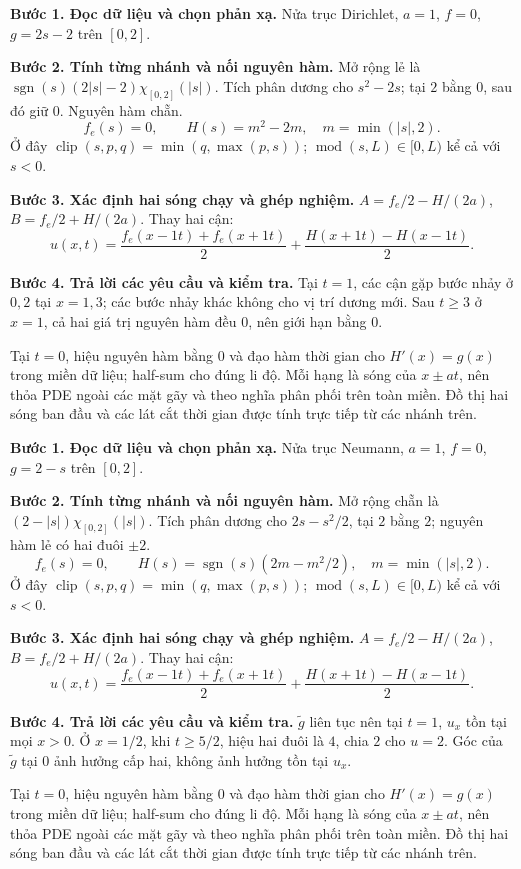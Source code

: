 \textbf{Bước 1. Đọc dữ liệu và chọn phản xạ.} Nửa trục Dirichlet, $a=1$, $f=0$, $g=2s-2$ trên $[0,2]$.

\textbf{Bước 2. Tính từng nhánh và nối nguyên hàm.} Mở rộng lẻ là $\operatorname{sgn}(s)(2|s|-2)\chi_{[0,2]}(|s|)$. Tích phân dương cho $s^2-2s$; tại $2$ bằng $0$, sau đó giữ $0$. Nguyên hàm chẵn.
\[f_e(s)=0,\qquad H(s)=m^2-2m,\quad m=\min(|s|,2).\]
Ở đây $\operatorname{clip}(s,p,q)=\min(q,\max(p,s))$; $\operatorname{mod}(s,L)\in[0,L)$ kể cả với $s<0$.

\textbf{Bước 3. Xác định hai sóng chạy và ghép nghiệm.} $A=f_e/2-H/(2a)$, $B=f_e/2+H/(2a)$. Thay hai cận:
\[u(x,t)=\frac{f_e(x-1t)+f_e(x+1t)}2+\frac{H(x+1t)-H(x-1t)}{2}.\]

\textbf{Bước 4. Trả lời các yêu cầu và kiểm tra.} Tại $t=1$, các cận gặp bước nhảy ở $0,2$ tại $x=1,3$; các bước nhảy khác không cho vị trí dương mới. Sau $t\ge3$ ở $x=1$, cả hai giá trị nguyên hàm đều $0$, nên giới hạn bằng $0$.

Tại $t=0$, hiệu nguyên hàm bằng $0$ và đạo hàm thời gian cho $H'(x)=g(x)$ trong miền dữ liệu; half-sum cho đúng li độ. Mỗi hạng là sóng của $x\pm at$, nên thỏa PDE ngoài các mặt gãy và theo nghĩa phân phối trên toàn miền. Đồ thị hai sóng ban đầu và các lát cắt thời gian được tính trực tiếp từ các nhánh trên.

\textbf{Bước 1. Đọc dữ liệu và chọn phản xạ.} Nửa trục Neumann, $a=1$, $f=0$, $g=2-s$ trên $[0,2]$.

\textbf{Bước 2. Tính từng nhánh và nối nguyên hàm.} Mở rộng chẵn là $(2-|s|)\chi_{[0,2]}(|s|)$. Tích phân dương cho $2s-s^2/2$, tại $2$ bằng $2$; nguyên hàm lẻ có hai đuôi $\pm2$.
\[f_e(s)=0,\qquad H(s)=\operatorname{sgn}(s)(2m-m^2/2),\quad m=\min(|s|,2).\]
Ở đây $\operatorname{clip}(s,p,q)=\min(q,\max(p,s))$; $\operatorname{mod}(s,L)\in[0,L)$ kể cả với $s<0$.

\textbf{Bước 3. Xác định hai sóng chạy và ghép nghiệm.} $A=f_e/2-H/(2a)$, $B=f_e/2+H/(2a)$. Thay hai cận:
\[u(x,t)=\frac{f_e(x-1t)+f_e(x+1t)}2+\frac{H(x+1t)-H(x-1t)}{2}.\]

\textbf{Bước 4. Trả lời các yêu cầu và kiểm tra.} $\widetilde g$ liên tục nên tại $t=1$, $u_x$ tồn tại mọi $x>0$. Ở $x=1/2$, khi $t\ge5/2$, hiệu hai đuôi là $4$, chia $2$ cho $u=2$. Góc của $\widetilde g$ tại $0$ ảnh hưởng cấp hai, không ảnh hưởng tồn tại $u_x$.

Tại $t=0$, hiệu nguyên hàm bằng $0$ và đạo hàm thời gian cho $H'(x)=g(x)$ trong miền dữ liệu; half-sum cho đúng li độ. Mỗi hạng là sóng của $x\pm at$, nên thỏa PDE ngoài các mặt gãy và theo nghĩa phân phối trên toàn miền. Đồ thị hai sóng ban đầu và các lát cắt thời gian được tính trực tiếp từ các nhánh trên.


